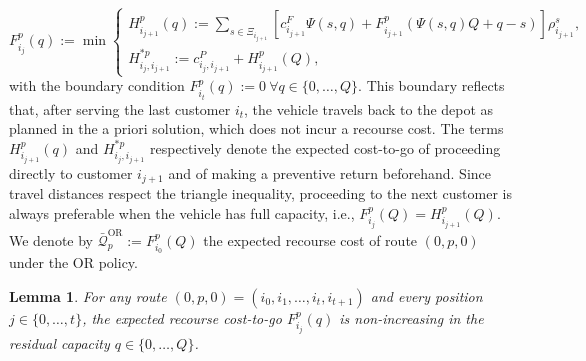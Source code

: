 \documentclass[10pt,a4paper]{amsart}
\newtheorem{lemma}{Lemma}
\newcommand{\rev}[1]{{\color{black}#1}}
\begin{document}
\begin{equation}
    F^p_{i_j}(q) := \min
    \begin{cases} \label{def:cost-to-go}
        H^p_{i_{j+1}}(q) := \sum\limits_{s \in \Xi_{i_{j+1}}} \left[c_{i_{j+1}}^F\Psi(s,q) + F^p_{i_{j+1}}\left(\Psi(s,q)Q + q -s  \right) \right]\rho_{i_{j+1}}^s, \\
        H^{*p}_{i_j,i_{j+1}} := c_{i_j, i_{j+1}}^P+H^p_{i_{j+1}}(Q),
    \end{cases}
\end{equation}
with the boundary condition $F^p_{i_{t}}(q):=0 \ \forall q \in \{0,\dots,Q\}$. This boundary reflects that, after serving the last customer $i_{t}$, the vehicle travels back to the depot as planned in the a priori solution, which does not incur a recourse cost. The terms $H^p_{i_{j+1}}(q)$ and $H^{*p}_{i_j,i_{j+1}}$ respectively denote the expected cost-to-go of proceeding directly to customer $i_{j+1}$ and of making a preventive return beforehand. Since travel distances respect the triangle inequality, proceeding to the next customer is always preferable when the vehicle has full capacity, i.e., $F^p_{i_j}(Q) = H^p_{i_{j+1}}(Q)$. We denote by $\bar{\mathcal{Q}}^{\text{OR}}_p:=F^p_{i_0}(Q)$ the expected recourse cost of route $(0,p,0)$ under the OR policy.

\begin{lemma}
\label{lemma:monotonicity_cost_to_go}
For any \rev{route $(0, p, 0) = (i_0, i_{1}, \dots, i_{t}, i_{t+1})$ and every position $j \in \{0,\dots,t\}$}, the expected recourse cost-to-go $F^{p}_{i_{j}}(q)$ is non-increasing in the residual capacity \rev{$q \in \{0,\dots,Q\}$}.
\end{lemma}
\end{document}
